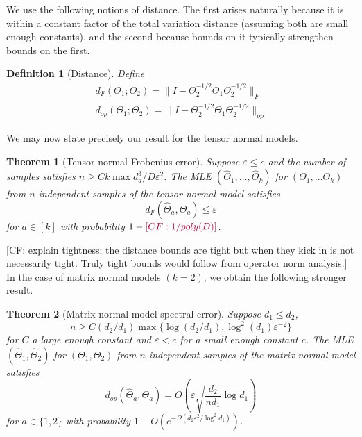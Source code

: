 \documentclass{article}
\newtheorem{theorem}{Theorem}
\newtheorem{definition}{Definition}
\newcommand\eps{\varepsilon}
\newcommand{\CF}[1]{{\color{purple}[CF: #1]}}
\begin{document}
We use the following notions of distance. The first arises naturally because it is within a constant factor of the total variation distance (assuming both are small enough constants), and the second because bounds on it typically strengthen bounds on the first.

\begin{definition}[Distance]
Define
\begin{align}d_{F}(\Theta_1; \Theta_2) = \| I - \Theta_2^{-1/2} \Theta_1 \Theta_2^{-1/2}\|_F\\
d_{op}(\Theta_1; \Theta_2) = \| I - \Theta_2^{-1/2} \Theta_1 \Theta_2^{-1/2}\|_{op}
\end{align}
\end{definition}

We may now state precisely our result for the tensor normal models.

\begin{theorem}[Tensor normal Frobenius error]\label{thm:tensor-frobenius} Suppose $\eps \leq c$ and the number of samples satisfies $n \geq C k \max d_{a}^3/D\eps^2$. The MLE $(\widehat{\Theta}_1, \dots, \widehat{\Theta}_k) $ for $(\Theta_1, \dots \Theta_k)$ from $n$ independent samples of the tensor normal model satisfies
$$ d_{F}(\widehat{\Theta}_a, \Theta_a) \leq \eps $$
for $a \in [k]$ with probability $1 - \CF{1/poly(D)}$.
\end{theorem}

\CF{explain tightness; the distance bounds are tight but when they kick in is not necessarily tight. Truly tight bounds would follow from operator norm analysis.} In the case of matrix normal models $(k=2)$, we obtain the following stronger result.

\begin{theorem}[Matrix normal model spectral error]\label{thm:matrix-normal} Suppose $d_1 \leq d_2$,
$$n \geq C (d_2/d_1) \max\{\log (d_2/d_1),  \log^2(d_1) \eps^{-2}\}$$ for $C$ a large enough constant and $\eps < c$ for a small enough constant $c$. The MLE $(\widehat{\Theta}_1,\widehat{\Theta}_2) $ for $(\Theta_1, \Theta_2)$ from $n$ independent samples of the matrix normal model satisfies
$$ d_{op}(\widehat{\Theta}_a, \Theta_a) = O\left(\eps \sqrt{\frac{d_2}{n d_1}} \log d_1\right) $$
for $a \in \{1,2\}$ with probability $1 - O(e^{ - \Omega( d_2 \eps^2/\log^2 d_1)})$.
\end{theorem}
\end{document}
